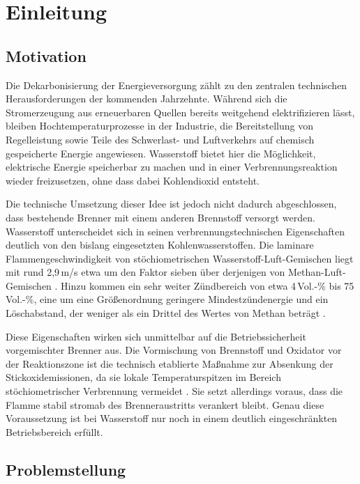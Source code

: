 \chapter{Einleitung}\label{chapter:einleitung}

\section{Motivation}\label{sec:motivation}

Die Dekarbonisierung der Energieversorgung zählt zu den zentralen technischen
Herausforderungen der kommenden Jahrzehnte. Während sich die Stromerzeugung aus
erneuerbaren Quellen bereits weitgehend elektrifizieren lässt, bleiben
Hochtemperaturprozesse in der Industrie, die Bereitstellung von Regelleistung
sowie Teile des Schwerlast- und Luftverkehrs auf chemisch gespeicherte Energie
angewiesen. Wasserstoff bietet hier die Möglichkeit, elektrische Energie
speicherbar zu machen und in einer Verbrennungsreaktion wieder freizusetzen,
ohne dass dabei Kohlendioxid entsteht.

Die technische Umsetzung dieser Idee ist jedoch nicht dadurch abgeschlossen,
dass bestehende Brenner mit einem anderen Brennstoff versorgt werden.
Wasserstoff unterscheidet sich in seinen verbrennungstechnischen Eigenschaften
deutlich von den bislang eingesetzten Kohlenwasserstoffen. Die laminare
Flammengeschwindigkeit von stöchiometrischen Wasserstoff-Luft-Gemischen liegt
mit rund 2,9\,m/s etwa um den Faktor sieben über derjenigen von
Methan-Luft-Gemischen \cite{Law_2006, Verhelst_2009}. Hinzu kommen ein sehr
weiter Zündbereich von etwa 4\,Vol.-\% bis 75\,Vol.-\%,
eine um eine Größenordnung geringere Mindestzündenergie und ein Löschabstand,
der weniger als ein Drittel des Wertes von Methan beträgt
\cite{Verhelst_2009, Warnatz_2001}.

Diese Eigenschaften wirken sich unmittelbar auf die Betriebssicherheit
vorgemischter Brenner aus. Die Vormischung von Brennstoff und Oxidator vor der
Reaktionszone ist die technisch etablierte Maßnahme zur Absenkung der
Stickoxidemissionen, da sie lokale Temperaturspitzen im Bereich
stöchiometrischer Verbrennung vermeidet \cite{Lieuwen_2008}. Sie setzt
allerdings voraus, dass die Flamme stabil stromab des Brenneraustritts
verankert bleibt. Genau diese Voraussetzung ist bei Wasserstoff nur noch in
einem deutlich eingeschränkten Betriebsbereich erfüllt.

\section{Problemstellung}\label{sec:problemstellung}

